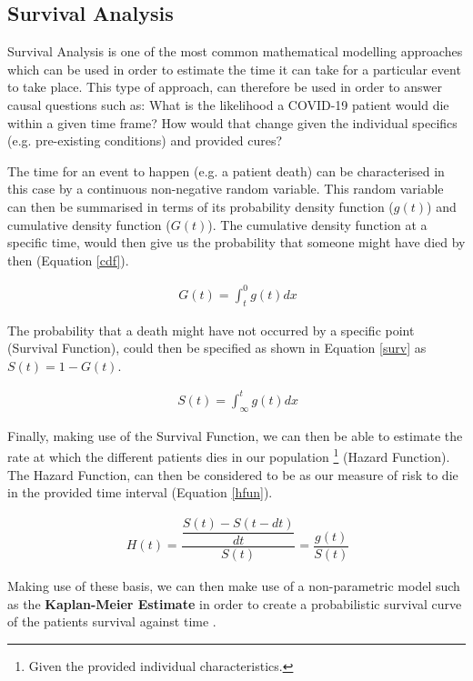 \subsection{Survival Analysis}
Survival Analysis is one of the most common mathematical modelling approaches which can be used in order to estimate the time it can take for a particular event to take place. This type of approach, can therefore be used in order to answer causal questions such as: What is the likelihood a COVID-19 patient would die within a given time frame? How would that change given the individual specifics (e.g. pre-existing conditions) and provided cures?

The time for an event to happen (e.g. a patient death) can be characterised in this case by a continuous non-negative random variable. This random variable can then be summarised in terms of its probability density function ($g(t)$) and cumulative density function ($G(t)$). The cumulative density function at a specific time, would then give us the probability that someone might have died by then (Equation \ref{cdf}).

\useshortskip
\begin{align}
\ G(t) =\int_{t}^{0} g(t) dx
\label{cdf}
\end{align}
\useshortskip

The probability that a death might have not occurred by a specific point (Survival Function), could then be specified as shown in Equation \ref{surv} as $S(t) = 1 - G(t)$.

\useshortskip
\begin{align}
\ S(t) =\int_{\infty}^{t} g(t) dx
\label{surv}
\end{align}
\useshortskip

Finally, making use of the Survival Function, we can then be able to estimate the rate at which the different patients dies in our population \footnote{Given the provided individual characteristics.} (Hazard Function). The Hazard Function, can then be considered to be as our measure of risk to die in the provided time interval (Equation \ref{hfun}).

\useshortskip
\begin{align}
\ H(t) = \dfrac{\dfrac{S(t) - S(t - dt)}{dt}}{S(t)} = \dfrac{g(t)}{S(t)}
\label{hfun}
\end{align}
\useshortskip

Making use of these basis, we can then make use of a non-parametric model such as the \textbf{Kaplan-Meier Estimate} in order to create a probabilistic survival curve of the patients survival against time \cite{survival_an}.

